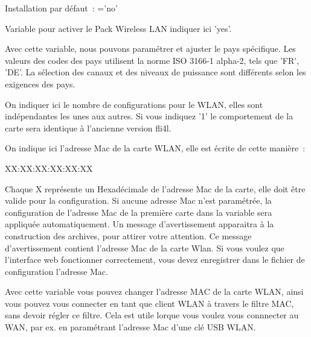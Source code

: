 \begin{description}

      Installation par défaut~: ='no'

      Variable pour activer le Pack Wireless LAN indiquer ici 'yes'.


      Avec cette variable, nous pouvons paramétrer et ajuster le pays
      spécifique. Les valeurs des codes des pays utilisent la norme
      ISO 3166-1 alpha-2, tels que 'FR', 'DE'. La sélection des canaux et des
      niveaux de puissance sont différents selon les exigences des pays.


      On indiquer ici le nombre de configurations pour le WLAN, elles sont
      indépendantes les unes aux autres. Si vous indiquez '1' le comportement de
      la carte sera identique à l'ancienne version fli4l.


      On indique ici l'adresse Mac de la carte WLAN, elle est écrite de cette
      manière~:

         XX:XX:XX:XX:XX:XX

      Chaque X représente un Hexadécimale de l'adresse Mac de la carte, elle
      doit être valide pour la configuration. Si aucune adresse Mac n'est
      paramétrée, la configuration de l'adresse Mac de la première carte dans la
      variable  sera appliquée automatiquement. Un message
      d'avertissement apparaitra à la construction des archives, pour attirer
      votre attention. Ce message d'avertissement contient l'adresse Mac de la
      carte Wlan. Si vous voulez que l'interface web fonctionner correctement,
      vous devez enregistrer dans le fichier de configuration l'adresse Mac.


      Avec cette variable vous pouvez changer l'adresse MAC de la carte WLAN,
      ainsi vous pouvez vous connecter en tant que client WLAN à travers le
      filtre MAC, sans devoir régler ce filtre. Cela est utile lorque vous
      voulez vous connnecter au WAN, par ex. en paramétrant l'adresse Mac
      d'une clé USB WLAN.



\end{description}
